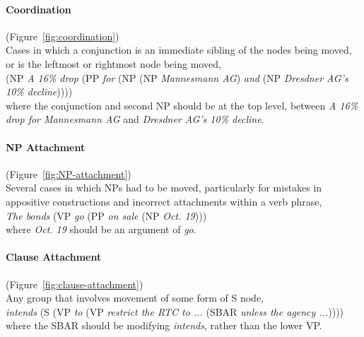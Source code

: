 \begin{figure}
\centering

\end{figure}

\paragraph{Coordination} (Figure~\ref{fig:coordination}) \\
Cases in which a conjunction is an immediate sibling of the nodes being moved, or is the leftmost or rightmost node being moved, \myeg \\
(NP \emph{A 16\% drop} (PP \emph{for} (NP (NP \emph{Mannesmann AG}) \emph{and} (NP \emph{Dresdner AG's 10\% decline})))) \\
where the conjunction and second NP should be at the top level, between \emph{A 16\% drop for Mannesmann AG} and \emph{Dresdner AG's 10\% decline}.

\paragraph{NP Attachment} (Figure~\ref{fig:NP-attachment}) \\
Several cases in which NPs had to be moved, particularly for mistakes in appositive constructions and incorrect attachments within a verb phrase, \myeg \\
\emph{The bonds} (VP \emph{go} (PP \emph{on sale} (NP \emph{Oct.\@\xspace 19}))) \\
where \emph{Oct.\@\xspace 19} should be an argument of \emph{go}.

\paragraph{Clause Attachment} (Figure~\ref{fig:clause-attachment}) \\
Any group that involves movement of some form of S node, \myeg \\
\emph{intends} (S (VP \emph{to} (VP \emph{restrict the RTC to ...\@\xspace} (SBAR \emph{unless the agency ...\@\xspace})))) \\
where the SBAR should be modifying \emph{intends}, rather than the lower VP.

\begin{landscape}
\begin{figure}
\centering
\begin{minipage}[b]{3.5in}
\centering

\end{minipage}\hfill
\begin{minipage}[b]{4.5in}
\centering

\end{minipage}
\end{figure}
\end{landscape}

